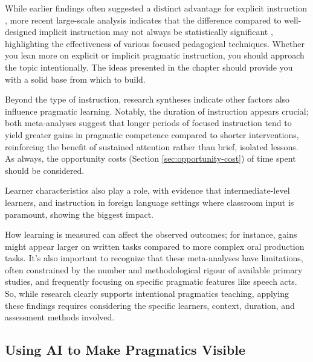 While earlier findings often suggested a distinct advantage for explicit instruction \autocite{JeonKaya2006}, more recent large-scale analysis indicates that the difference compared to well-designed implicit instruction may not always be statistically significant \autocite{RenLiLu2022}, highlighting the effectiveness of various focused pedagogical techniques. Whether you lean more on explicit or implicit pragmatic instruction, you should approach the topic intentionally. The ideas presented in the chapter should provide you with a solid base from which to build.

Beyond the type of instruction, research syntheses indicate other factors also influence pragmatic learning. Notably, the duration of instruction appears crucial; both meta-analyses suggest that longer periods of focused instruction tend to yield greater gains in pragmatic competence compared to shorter interventions, reinforcing the benefit of sustained attention rather than brief, isolated lessons. As always, the opportunity costs (Section \ref{sec:opportunity-cost}) of time spent should be considered.

Learner characteristics also play a role, with evidence that intermediate-level learners, and instruction in foreign language settings where classroom input is paramount, showing the biggest impact.

How learning is measured can affect the observed outcomes; for instance, gains might appear larger on written tasks compared to more complex oral production tasks. It's also important to recognize that these meta-analyses have limitations, often constrained by the number and methodological rigour of available primary studies, and frequently focusing on specific pragmatic features like speech acts. So, while research clearly supports intentional pragmatics teaching, applying these findings requires considering the specific learners, context, duration, and assessment methods involved.

\subsection{Using AI to Make Pragmatics Visible}

